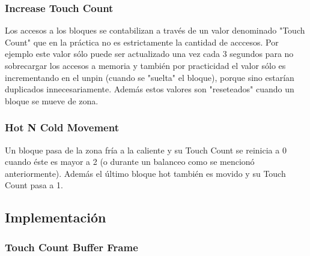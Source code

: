 \subsubsection{Increase Touch Count }

Los accesos a los bloques se contabilizan a través de un valor denominado "Touch Count" que en la práctica no es estrictamente la 
cantidad de acccesos. Por ejemplo este valor sólo puede ser actualizado una vez cada 3 segundos para no sobrecargar los accesos a memoria y también por practicidad el valor sólo es incrementando en el unpin (cuando se "suelta" el bloque), porque sino estarían duplicados innecesariamente. Además estos valores son "reseteados" cuando un bloque se mueve de zona.\\


\subsubsection{Hot N Cold Movement}

Un bloque pasa de la zona fría a la caliente y su Touch Count se reinicia a 0 cuando éste es mayor a 2 (o durante un balanceo como se mencionó anteriormente). Además el último bloque hot también es movido y su Touch Count pasa a 1.\\

\subsection{Implementación}
\subsubsection{Touch Count Buffer Frame}

